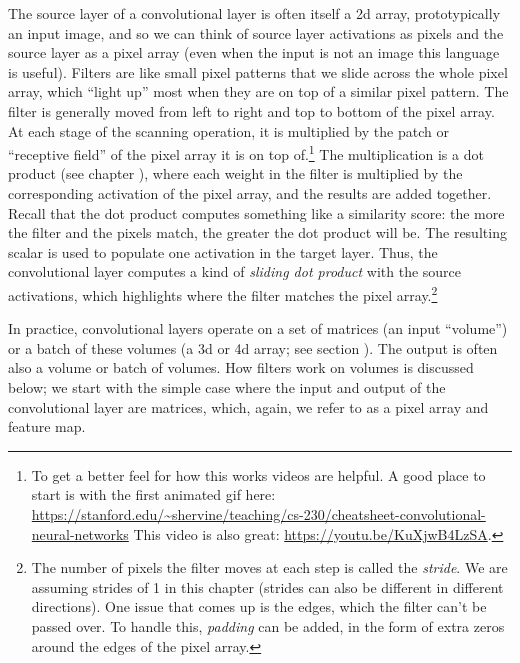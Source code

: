  The source layer of a convolutional layer is often itself a 2d array, prototypically an input image, and so we can think of  source layer activations as pixels and the source layer as a pixel array (even when the input is not an image this language is useful). Filters are like small pixel patterns that we slide across the whole pixel array, which ``light up'' most when they are on top of a similar pixel pattern. The filter is generally moved from left to right and top to bottom of the pixel array. At each stage of the scanning operation, it is multiplied by the patch or ``receptive field''  of the pixel array it is on top of.\footnote{To get a better feel for how this works videos are  helpful. A good place  to start is with the first animated gif here: \url{https://stanford.edu/~shervine/teaching/cs-230/cheatsheet-convolutional-neural-networks} This video is also great: \url{https://youtu.be/KuXjwB4LzSA}.}  The multiplication is a dot product (see chapter ), where each weight in the filter is multiplied by the corresponding activation of the pixel array, and the results are added together.  Recall that the dot product computes something like a similarity score: the more the filter and the pixels match, the greater the dot product will be. The resulting scalar is used to populate one activation in the target layer. Thus, the convolutional layer computes a kind of \emph{sliding dot product} with the source activations, which highlights where the filter matches the pixel array.\footnote{The number of pixels the filter moves at each step is called the \emph{stride}. We are assuming strides of 1 in this chapter (strides can also be different in different directions).  One issue that comes up is the edges, which the filter can't be passed over. To handle this, \emph{padding} can be added, in the form of extra zeros around the edges of the pixel array.}

In practice, convolutional layers operate on a set of matrices  (an input ``volume'') or a batch of these volumes (a 3d or 4d array; see section ). The output is often also a volume or batch of volumes. How filters work on volumes is discussed below; we start with the simple case where the input and output of the convolutional layer are matrices, which, again, we refer to as a pixel array and feature map.

